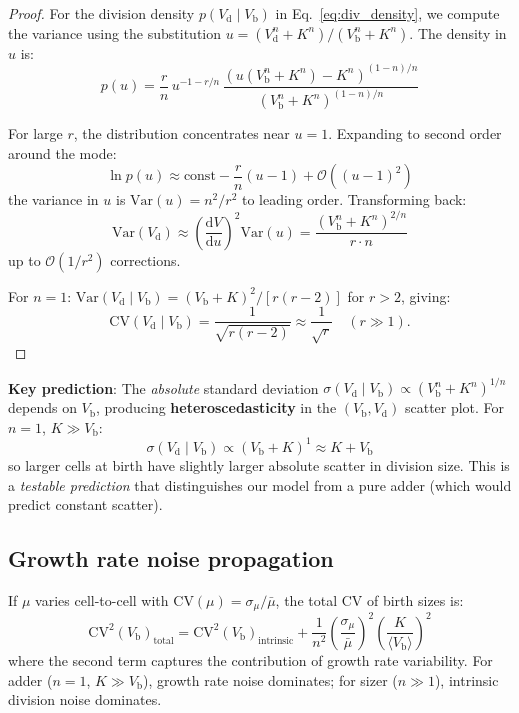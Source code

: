 \documentclass[11pt]{article}
\newcommand{\Vb}{V_{\mathrm{b}}}
\newcommand{\Vd}{V_{\mathrm{d}}}
\newcommand{\CV}{\mathrm{CV}}
\newcommand{\Var}{\mathrm{Var}}
\newcommand{\dd}{\mathrm{d}}
\newcommand{\Order}{\mathcal{O}}
\begin{document}
\begin{proof}
For the division density $p(\Vd \mid \Vb)$ in Eq.~\eqref{eq:div_density}, we compute the variance using the substitution $u = (\Vd^n + K^n)/(\Vb^n + K^n)$. The density in $u$ is:
\begin{equation}
  p(u) = \frac{r}{n}\, u^{-1-r/n}\, \frac{(u(\Vb^n+K^n)-K^n)^{(1-n)/n}}{(\Vb^n+K^n)^{(1-n)/n}}
\end{equation}

For large $r$, the distribution concentrates near $u = 1$. Expanding to second order around the mode:
\begin{equation}
  \ln p(u) \approx \text{const} - \frac{r}{n}(u-1) + \Order((u-1)^2)
\end{equation}
the variance in $u$ is $\Var(u) = n^2/r^2$ to leading order. Transforming back:
\begin{equation}
  \Var(\Vd) \approx \left(\frac{\dd V}{\dd u}\right)^2 \Var(u) = \frac{(\Vb^n + K^n)^{2/n}}{r \cdot n}
\end{equation}
up to $\Order(1/r^2)$ corrections.

For $n = 1$: $\Var(\Vd \mid \Vb) = (\Vb + K)^2 / [r(r-2)]$ for $r > 2$, giving:
\begin{equation}
  \CV(\Vd \mid \Vb) = \frac{1}{\sqrt{r(r-2)}} \approx \frac{1}{\sqrt{r}} \quad (r \gg 1).
\end{equation}
\end{proof}

\textbf{Key prediction}: The \emph{absolute} standard deviation $\sigma(\Vd \mid \Vb) \propto (\Vb^n + K^n)^{1/n}$ depends on $\Vb$, producing \textbf{heteroscedasticity} in the $(\Vb, \Vd)$ scatter plot. For $n = 1$, $K \gg \Vb$:
\begin{equation}
  \sigma(\Vd \mid \Vb) \propto (\Vb + K)^{1} \approx K + \Vb
\end{equation}
so larger cells at birth have slightly larger absolute scatter in division size. This is a \emph{testable prediction} that distinguishes our model from a pure adder (which would predict constant scatter).

\subsection{Growth rate noise propagation}

If $\mu$ varies cell-to-cell with $\CV(\mu) = \sigma_\mu/\bar\mu$, the total CV of birth sizes is:
\begin{equation}
  \CV^2(\Vb)_{\mathrm{total}} = \CV^2(\Vb)_{\mathrm{intrinsic}} + \frac{1}{n^2}\left(\frac{\sigma_\mu}{\bar\mu}\right)^2\left(\frac{K}{\langle\Vb\rangle}\right)^2
\end{equation}
where the second term captures the contribution of growth rate variability. For adder ($n=1$, $K \gg \Vb$), growth rate noise dominates; for sizer ($n \gg 1$), intrinsic division noise dominates.
\end{document}
